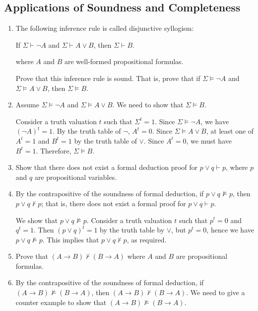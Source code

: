 \documentclass[11pt]{article}
\makeatletter
\theoremstyle{definition}
\newenvironment{pf}[1][\proofname]{\par
  \pushQED{\qed}%
  \normalfont \topsep0\p@\relax
  \trivlist
  \item[\hskip\labelsep\itshape
  #1\@addpunct{.}]\ignorespaces
}{%
  \popQED\endtrivlist\@endpefalse
}
\makeatother
\begin{document}
\newpage
\subsection{Applications of Soundness and Completeness}

\begin{enumerate}

\item The following inference rule is called disjunctive syllogism:
\begin{center}
    If $\Sigma \vdash \neg A$ and $\Sigma \vdash A \vee B$, then $\Sigma \vdash B$.
\end{center}
where $A$ and $B$ are well-formed propositional formulas.

Prove that this inference rule is sound. That is, prove that if $\Sigma \vDash \neg A$ and $\Sigma \vDash A \vee B$, then $\Sigma \vDash B$.

\begin{pf}
Assume $\Sigma \vDash \neg A$ and $\Sigma \vDash A \vee B$. We need to show that $\Sigma \vDash B$. 

Consider a truth valuation $t$ such that $\Sigma^t = 1$. Since $\Sigma \vDash \neg A$, we have $(\neg A)^t = 1$. By the truth table of $\neg$, $A^t = 0$. Since $\Sigma \vDash A \vee B$, at least one of $A^t = 1$ and $B^t = 1$ by the truth table of $\vee$. Since $A^t = 0$, we must have $B^t = 1$. Therefore, $\Sigma \vDash B$.
\end{pf}

\item Show that there does not exist a formal deduction proof for $p \vee q \vdash p$, where $p$ and $q$ are propositional variables.

\begin{pf}
By the contrapositive of the soundness of formal deduction, if $p \vee q \nvDash p$, then $p \vee q \nvdash p$; that is, there does not exist a formal proof for $p \vee q \vdash p$. 

We show that $p \vee q \nvDash p$. Consider a truth valuation $t$ such that $p^t = 0$ and $q^t = 1$. Then $(p \vee q)^t = 1$ by the truth table by $\vee$, but $p^t = 0$, hence we have $p \vee q \nvDash p$. This implies that $p \vee q \nvdash p$, as required.
\end{pf}

\item Prove that $(A \rightarrow B) \nvdash (B \rightarrow A)$ where $A$ and $B$ are propositional formulas.

\begin{pf}
By the contrapositive of the soundness of formal deduction, if $(A \rightarrow B) \nvDash (B \rightarrow A)$, then $(A \rightarrow B) \nvdash (B \rightarrow A)$. We need to give a counter example to show that $(A \rightarrow B) \nvDash (B \rightarrow A)$. 


\end{pf}
\end{enumerate}
\end{document}

